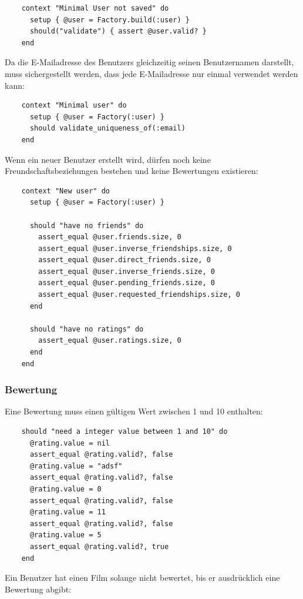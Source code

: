 \begin{verbatim}
    context "Minimal User not saved" do
      setup { @user = Factory.build(:user) }
      should("validate") { assert @user.valid? }
    end
\end{verbatim}

Da die E-Mailadresse des Benutzers gleichzeitig seinen Benutzernamen darstellt,
muss sichergestellt werden, dass jede E-Mailadresse nur einmal verwendet werden
kann:

\begin{verbatim}
    context "Minimal user" do
      setup { @user = Factory(:user) }
      should validate_uniqueness_of(:email)
    end
\end{verbatim}

Wenn ein neuer Benutzer erstellt wird, dürfen noch keine Freundschaftsbeziehungen
bestehen und keine Bewertungen existieren:

\begin{verbatim}
    context "New user" do
      setup { @user = Factory(:user) }

      should "have no friends" do
        assert_equal @user.friends.size, 0
        assert_equal @user.inverse_friendships.size, 0
        assert_equal @user.direct_friends.size, 0
        assert_equal @user.inverse_friends.size, 0
        assert_equal @user.pending_friends.size, 0
        assert_equal @user.requested_friendships.size, 0
      end

      should "have no ratings" do
        assert_equal @user.ratings.size, 0
      end
    end
\end{verbatim}

\subsubsection{Bewertung}
Eine Bewertung muss einen gültigen Wert zwischen 1 und 10 enthalten:

\begin{verbatim}
    should "need a integer value between 1 and 10" do
      @rating.value = nil
      assert_equal @rating.valid?, false
      @rating.value = "adsf"
      assert_equal @rating.valid?, false
      @rating.value = 0
      assert_equal @rating.valid?, false
      @rating.value = 11
      assert_equal @rating.valid?, false
      @rating.value = 5
      assert_equal @rating.valid?, true
    end
\end{verbatim}

Ein Benutzer hat einen Film solange nicht bewertet, bis er ausdrücklich
eine Bewertung abgibt:


